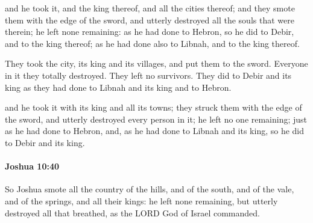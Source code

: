 			\begin{versebox}
					\item[BHS] 
					\item[ASV] and he took it, and the king thereof, and all the cities thereof; and they smote them with the edge of the sword, and utterly destroyed all the souls that were therein; he left none remaining: as he had done to Hebron, so he did to Debir, and to the king thereof; as he had done also to Libnah, and to the king thereof.
					\item[NIV] They took the city, its king and its villages, and put them to the sword. Everyone in it they totally destroyed. They left no survivors. They did to Debir and its king as they had done to Libnah and its king and to Hebron.
					\item[NRSV] and he took it with its king and all its towns; they struck them with the edge of the sword, and utterly destroyed every person in it; he left no one remaining; just as he had done to Hebron, and, as he had done to Libnah and its king, so he did to Debir and its king.
			\end{versebox}

		\paragraph{Joshua 10:40} %
			\label{JOSHUA-10-40}

			So Joshua smote all the country of the hills, and of the south, and of the vale, and of the springs, and all their kings: he left none remaining, but utterly destroyed all that breathed, as the LORD God of Israel commanded.

